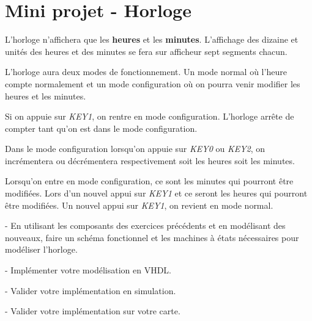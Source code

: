 \section{Mini projet - Horloge}

L'horloge n'affichera que les \textbf{heures} et les \textbf{minutes}. L'affichage des dizaine et unités des heures et des minutes se fera sur afficheur sept segments chacun.

\medskip

L'horloge aura deux modes de fonctionnement. Un mode normal où l'heure compte normalement et un mode configuration où on pourra venir modifier les heures et les minutes.

\medskip
Si on appuie sur \textit{KEY1}, on rentre en mode configuration. L'horloge arrête de compter tant qu'on est dans le mode configuration.

\medskip

Dans le mode configuration lorsqu'on appuie sur \textit{KEY0} ou \textit{KEY2}, on incrémentera ou décrémentera respectivement soit les heures soit les minutes.

\medskip

Lorsqu'on entre en mode configuration, ce sont les minutes qui pourront être modifiées. Lors d'un nouvel appui sur \textit{KEY1} et ce seront les heures qui pourront être modifiées. Un nouvel appui sur \textit{KEY1}, on revient en mode normal.

\medskip

- En utilisant les composants des exercices précédents et en modélisant des nouveaux, faire un schéma fonctionnel et les machines à états nécessaires pour modéliser l'horloge.

\medskip

- Implémenter votre modélisation en VHDL.

\medskip

- Valider votre implémentation en simulation.

\medskip

- Valider votre implémentation sur votre carte.
